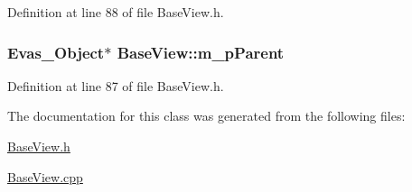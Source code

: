 Definition at line 88 of file Base\-View.\-h.

\hypertarget{class_base_view_af2e9d5f37dc60430d28cebcb55ffe2b4}{
\subsubsection[{m\-\_\-p\-Parent}]{\setlength{\rightskip}{0pt plus 5cm}Evas\-\_\-\-Object$\ast$ Base\-View\-::m\-\_\-p\-Parent\hspace{0.3cm}{\ttfamily [protected]}}}\label{class_base_view_af2e9d5f37dc60430d28cebcb55ffe2b4}


Definition at line 87 of file Base\-View.\-h.



The documentation for this class was generated from the following files\-:\begin{DoxyCompactItemize}
\item 
\hyperlink{_base_view_8h}{Base\-View.\-h}\item 
\hyperlink{_base_view_8cpp}{Base\-View.\-cpp}\end{DoxyCompactItemize}
